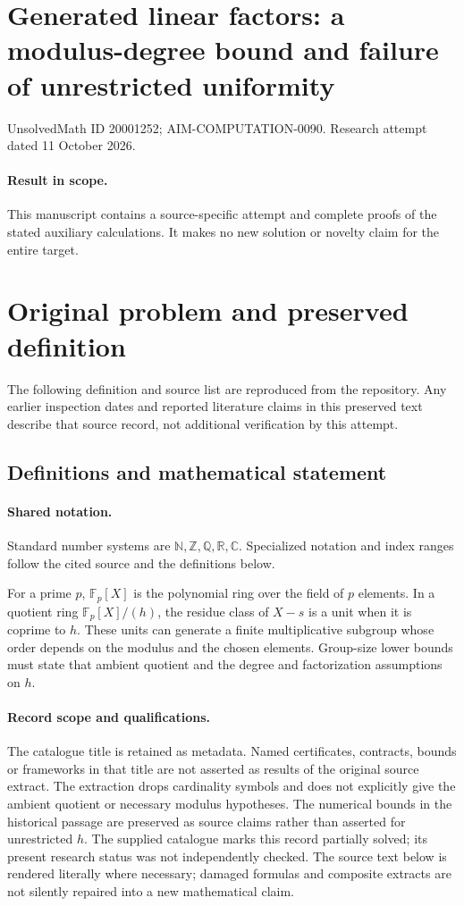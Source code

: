 \documentclass[11pt]{article}
\begin{document}
\section*{Generated linear factors: a modulus-degree bound and failure of unrestricted uniformity}
\noindent UnsolvedMath ID 20001252; AIM-COMPUTATION-0090. Research attempt dated 11 October 2026.
\paragraph{Result in scope.}This manuscript contains a source-specific attempt and complete proofs of the stated auxiliary calculations. It makes no new solution or novelty claim for the entire target.
\section{Original problem and preserved definition}
The following definition and source list are reproduced from the repository. Any earlier inspection dates and reported literature claims in this preserved text describe that source record, not additional verification by this attempt.
\subsection{Definitions and mathematical statement}

\paragraph{Shared notation.}Standard number systems are $\mathbb N,\mathbb Z,\mathbb Q,\mathbb R,\mathbb C$. Specialized notation and index ranges follow the cited source and the definitions below.


For a prime $p$, $\mathbb F_p[X]$ is the polynomial ring over the field of $p$ elements. In a quotient ring $\mathbb F_p[X]/(h)$, the residue class of $X-s$ is a unit when it is coprime to $h$. These units can generate a finite multiplicative subgroup whose order depends on the modulus and the chosen elements. Group-size lower bounds must state that ambient quotient and the degree and factorization assumptions on $h$.
\paragraph{Record scope and qualifications.}
The catalogue title is retained as metadata. Named certificates, contracts, bounds or frameworks in that title are not asserted as results of the original source extract.
The extraction drops cardinality symbols and does not explicitly give the ambient quotient or necessary modulus hypotheses. The numerical bounds in the historical passage are preserved as source claims rather than asserted for unrestricted $h$. The supplied catalogue marks this record partially solved; its present research status was not independently checked.
The source text below is rendered literally where necessary; damaged formulas and composite extracts are not silently repaired into a new mathematical claim.
\end{document}
